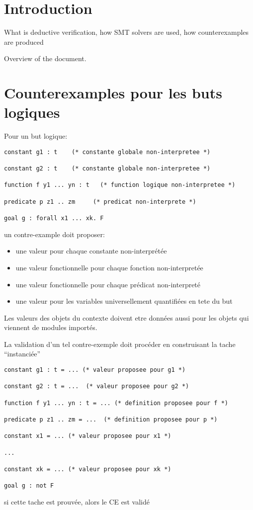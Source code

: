 \documentclass[a4paper,twoside]{article}
\begin{document}
\sloppy{}
\makeRR   %


\tableofcontents
\clearpage

\listoffigures

\clearpage

\section{Introduction}

What is deductive verification, how SMT solvers are used, how counterexamples are produced

Overview of the document.

\section{Counterexamples pour les buts logiques}


Pour un but logique:
\begin{lstlisting}
constant g1 : t    (* constante globale non-interpretee *)

constant g2 : t    (* constante globale non-interpretee *)

function f y1 ... yn : t   (* function logique non-interpretee *)

predicate p z1 .. zm     (* predicat non-interprete *)

goal g : forall x1 ... xk. F
\end{lstlisting}

un contre-example doit proposer:
\begin{itemize}
\item une valeur pour chaque constante non-interprétée
\item une valeur fonctionnelle pour chaque fonction non-interpretée
\item une valeur fonctionnelle pour chaque prédicat non-interpreté
\item une valeur pour les variables universellement quantifiées en tete du but
\end{itemize}
Les valeurs des objets du contexte doivent etre données aussi pour les objets
qui viennent de modules importés.


La validation d'un tel contre-exemple doit procéder en construisant la tache ``instanciée''
\begin{lstlisting}
constant g1 : t = ... (* valeur proposee pour g1 *)

constant g2 : t = ...  (* valeur proposee pour g2 *)

function f y1 ... yn : t = ... (* definition proposee pour f *)

predicate p z1 .. zm = ...  (* definition proposee pour p *)

constant x1 = ... (* valeur proposee pour x1 *)

...

constant xk = ... (* valeur proposee pour xk *)

goal g : not F
\end{lstlisting}
si cette tache est prouvée, alors le CE est validé
\end{document}
